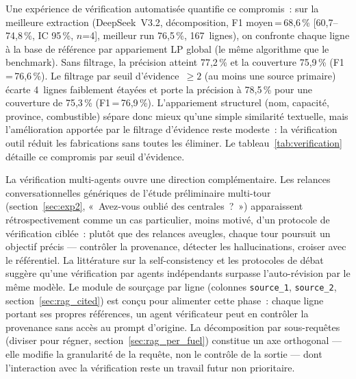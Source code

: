\documentclass[a4paper,11pt]{report}
\begin{document}
Une expérience de vérification automatisée quantifie ce compromis~: sur la meilleure extraction (DeepSeek~V3.2, décomposition, F1 moyen\,=\,68,6\,\% [60,7--74,8\,\%, IC 95\,\%, $n$=4], meilleur run 76,5\,\%, 167~lignes), on confronte chaque ligne à la base de référence par appariement LP global (le même algorithme que le benchmark). Sans filtrage, la précision atteint 77,2\,\% et la couverture 75,9\,\% (F1\,=\,76,6\,\%). Le filtrage par seuil d'évidence~$\geq 2$ (au moins une source primaire) écarte 4~lignes faiblement étayées et porte la précision à 78,5\,\% pour une couverture de 75,3\,\% (F1\,=\,76,9\,\%). L'appariement structurel (nom, capacité, province, combustible) sépare donc mieux qu'une simple similarité textuelle, mais l'amélioration apportée par le filtrage d'évidence reste modeste~: la vérification outil réduit les fabrications sans toutes les éliminer. Le tableau~\ref{tab:verification} détaille ce compromis par seuil d'évidence.

\begin{table}[htbp]
\centering
\caption{Compromis précision-couverture par seuil d'évidence. Vérification par appariement LP global contre la base de référence, sur l'extraction DeepSeek~V3.2 décomposée (167~lignes).}
\label{tab:verification}
\end{table}

La vérification multi-agents ouvre une direction complémentaire. Les relances conversationnelles génériques de l'étude préliminaire multi-tour (section~\ref{sec:exp2}, «~Avez-vous oublié des centrales~?~») apparaissent rétrospectivement comme un cas particulier, moins motivé, d'un protocole de vérification ciblée~: plutôt que des relances aveugles, chaque tour poursuit un objectif précis --- contrôler la provenance, détecter les hallucinations, croiser avec le référentiel. La littérature sur la self-consistency et les protocoles de débat suggère qu'une vérification par agents indépendants surpasse l'auto-révision par le même modèle. Le module de sourçage par ligne (colonnes \texttt{source\_1}, \texttt{source\_2}, section~\ref{sec:rag_cited}) est conçu pour alimenter cette phase~: chaque ligne portant ses propres références, un agent vérificateur peut en contrôler la provenance sans accès au prompt d'origine. La décomposition par sous-requêtes (diviser pour régner, section~\ref{sec:rag_per_fuel}) constitue un axe orthogonal --- elle modifie la granularité de la requête, non le contrôle de la sortie --- dont l'interaction avec la vérification reste un travail futur non prioritaire.
\end{document}
